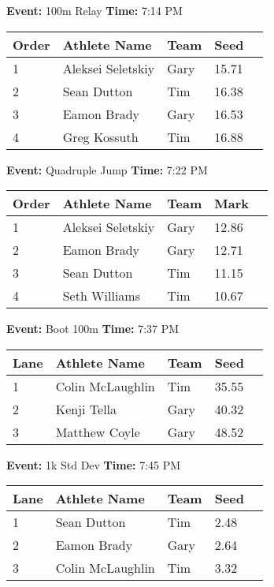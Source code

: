 \documentclass[10pt]{article}
\begin{document}
\textbf{Event:} 100m Relay \quad \textbf{Time:} 7:14 PM 

\vspace{1em}
\begin{tabular}{@{}lllll@{}}
\toprule

\textbf{Order} & \textbf{Athlete Name} & \textbf{Team} & \textbf{Seed} \\
\midrule
1 & Aleksei Seletskiy & Gary & 15.71 &\\
2 & Sean Dutton & Tim & 16.38 &\\
3 & Eamon Brady & Gary & 16.53 &\\
4 & Greg Kossuth & Tim & 16.88 &\\
\bottomrule
\end{tabular}
\vspace{2.5em}


\textbf{Event:} Quadruple Jump \quad \textbf{Time:} 7:22 PM 

\vspace{1em}
\begin{tabular}{@{}lllll@{}}
\toprule

\textbf{Order} & \textbf{Athlete Name} & \textbf{Team} & \textbf{Mark} \\
\midrule
1 & Aleksei Seletskiy & Gary & 12.86 &\\
2 & Eamon Brady & Gary & 12.71 &\\
3 & Sean Dutton & Tim & 11.15 &\\
4 & Seth Williams & Tim & 10.67 &\\
\bottomrule
\end{tabular}
\vspace{2.5em}


\textbf{Event:} Boot 100m \quad \textbf{Time:} 7:37 PM 

\vspace{1em}
\begin{tabular}{@{}lllll@{}}
\toprule

\textbf{Lane} & \textbf{Athlete Name} & \textbf{Team} & \textbf{Seed} \\
\midrule
1 & Colin McLaughlin & Tim & 35.55 &\\
2 & Kenji Tella & Gary & 40.32 &\\
3 & Matthew Coyle & Gary & 48.52 &\\
\bottomrule
\end{tabular}
\vspace{2.5em}


\textbf{Event:} 1k Std Dev \quad \textbf{Time:} 7:45 PM 

\vspace{1em}
\begin{tabular}{@{}lllll@{}}
\toprule

\textbf{Lane} & \textbf{Athlete Name} & \textbf{Team} & \textbf{Seed} \\
\midrule
1 & Sean Dutton & Tim & 2.48 &\\
2 & Eamon Brady & Gary & 2.64 &\\
3 & Colin McLaughlin & Tim & 3.32 &\\
\bottomrule
\end{tabular}
\vspace{2.5em}
\end{document}
